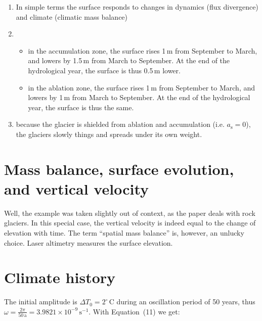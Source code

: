 \documentclass[DIV15,11pt,parskip=half]{scrartcl}
\newcommand{\cels}[1]{\ensuremath{#1^{\circ}\,\mathrm{C}}}
\begin{document}
\begin{enumerate}
\item In simple terms the surface responds to changes in dynamics (flux divergence) and climate (climatic mass balance)
\item
\begin{itemize}
\item in the accumulation zone, the surface rises 1\,m from September to March, and lowers by 1.5\,m from March to September. At the end of the hydrological year, the surface is thus 0.5\,m lower.
\item in the ablation zone, the surface rises 1\,m from September to March, and lowers by 1\,m from March to September. At the end of the hydrological year, the surface is thus the same.
\end{itemize}

\item because the glacier is shielded from ablation and accumulation (i.e. $a_{\textrm{s}} =0$), the glaciers slowly things and spreads under its own weight.
\end{enumerate}


\section{Mass balance, surface evolution, and vertical velocity}

Well, the example was taken slightly out of context, as the paper deals with rock glaciers. In this special case, the vertical velocity is indeed equal to the change of elevation with time. The term ``spatial mass balance'' is, however, an unlucky choice. Laser altimetry measures the surface elevation.

\section{Climate history}

The initial amplitude is $\Delta T_0 = \cels{2}$ during an oscillation period of 50 years, thus $\omega = \frac{2\pi}{50\,\text{a}} = 3.9821\times 10^{-9}\,\text{s}^{-1}$. With Equation~(11) we get:
\end{document}
